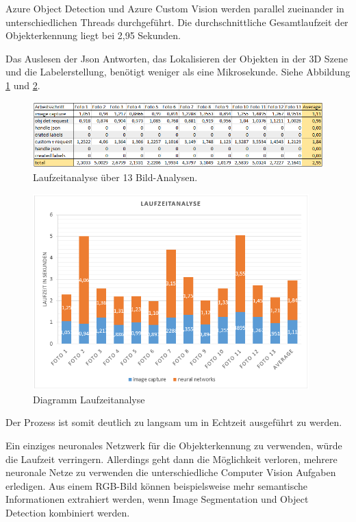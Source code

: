 Azure Object Detection und Azure Custom Vision werden parallel zueinander in unterschiedlichen Threads durchgeführt. Die durchschnittliche Gesamtlaufzeit der Objekterkennung liegt bei 2,95 Sekunden.

Das Auslesen der Json Antworten, das Lokalisieren der Objekten in der 3D Szene und die Labelerstellung, benötigt weniger als eine Mikrosekunde. Siehe Abbildung \ref{table:laufzeitanalyse} und \ref{table:laufzeitanalyse2}.

\begin{figure}[H]
	\centering
	\includegraphics[width=1\textwidth]{images/table_Laufzeitanalyseneu.PNG}
	\caption[Laufzeitanalyse über 13 Bild-Analysen]{Laufzeitanalyse über 13 Bild-Analysen.}
	\label{table:laufzeitanalyse}
\end{figure}

\begin{figure}[H]
	\centering
	\includegraphics[width=0.95\textwidth]{images/table_Laufzeitanalyse2neu.PNG}
	\caption[Diagramm Laufzeitanalyse]{Diagramm Laufzeitanalyse}
	\label{table:laufzeitanalyse2}
\end{figure}

Der Prozess ist somit deutlich zu langsam um in Echtzeit ausgeführt zu werden. 

Ein einziges neuronales Netzwerk für die Objekterkennung zu verwenden, würde die Laufzeit verringern. Allerdings geht dann die Möglichkeit verloren, mehrere neuronale Netze zu verwenden die unterschiedliche Computer Vision Aufgaben erledigen. Aus einem RGB-Bild können beispielsweise mehr semantische Informationen extrahiert werden, wenn Image Segmentation und Object Detection kombiniert werden.


